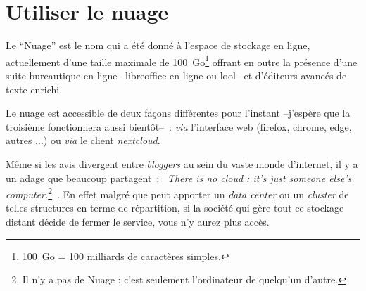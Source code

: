 \chapter{Utiliser le nuage}

Le ``Nuage'' est le nom qui a été donné à l'espace de stockage en ligne, actuellement d'une taille maximale de 100~Go\footnote{%
100~Go = 100 milliards de caractères simples.
} 
offrant en outre la présence d'une suite bureautique en ligne --libreoffice en ligne ou lool-- et d'éditeurs avancés de texte enrichi.

Le nuage est accessible de deux façons différentes pour l'instant --j'espère que la troisième fonctionnera aussi bientôt--~: \emph{via} l'interface web (firefox, chrome, edge, autres ...) ou \emph{via} le client \emph{nextcloud}.

Même si les avis divergent entre \emph{bloggers\/} au sein du vaste monde d'internet, il y a un adage que beaucoup partagent~: \og~\emph{There is no cloud : it's just someone else's computer.\/}\footnote{Il n'y a pas de Nuage : c'est seulement l'ordinateur de quelqu'un d'autre.}~\fg{}. 
En effet malgré que peut apporter un \emph{data center\/} ou un \emph{cluster} de telles structures en terme de répartition, si la société qui gère tout ce stockage distant décide de fermer le service, vous n'y aurez plus accès.











